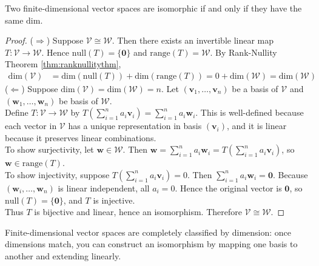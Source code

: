 \begin{theorem} \label{thm:isomorphicfindimvectorspace} Two finite-dimensional vector spaces are isomorphic if and only if they have the same $\text{dim}$.
\begin{proof} ($\Rightarrow$) Suppose $\mathcal{V} \cong \mathcal{W}$. Then there exists an invertible linear map $T: \mathcal{V} \rightarrow \mathcal{W}$. Hence $\text{null}(T) = \{ \mathbf{0} \}$ and $\text{range}(T) = \mathcal{W}$. By Rank-Nullity Theorem \ref{thm:ranknullitythm},
\begin{align}
\text{dim}(\mathcal{V}) &= \text{dim}(\text{null}(T)) + \text{dim}(\text{range}(T)) = 0 + \text{dim}(\mathcal{W}) = \text{dim}(\mathcal{W}) \nonumber
\end{align}
($\Leftarrow$) Suppose $\text{dim}(\mathcal{V}) = \text{dim}(\mathcal{W}) = n$. Let $(\mathbf{v}_1, \ldots, \mathbf{v}_n)$ be a basis of $\mathcal{V}$ and $(\mathbf{w}_1, \ldots, \mathbf{w}_n)$ be basis of $\mathcal{W}$.\\
Define $T: \mathcal{V} \rightarrow \mathcal{W}$ by $ T\left( \sum\limits_{i=1}^n a_i \mathbf{v}_i \right) = \sum\limits_{i=1}^n a_i \mathbf{w}_i$. This is well-defined because each vector in $\mathcal{V}$ has a unique representation in basis $(\mathbf{v}_i)$, and it is linear because it preserves linear combinations.\\
To show surjectivity, let $\mathbf{w} \in \mathcal{W}$. Then $\mathbf{w} = \sum\limits_{i=1}^n a_i \mathbf{w}_i = T \left( \sum\limits_{i=1}^n a_i \mathbf{v}_i \right)$, so $\mathbf{w} \in \text{range}(T)$.\\
To show injectivity, suppose $T \left( \sum\limits_{i=1}^n a_i \mathbf{v}_i \right) = 0$. Then $\sum\limits_{i=1}^n a_i \mathbf{w}_i = \mathbf{0}$. Because $(\mathbf{w}_i, \ldots, \mathbf{w}_n)$ is linear independent, all $a_i = 0$. Hence the original vector is $\mathbf{0}$, so $\text{null}(T) = \{ \mathbf{0} \}$, and $T$ is injective.\\
Thus $T$ is bijective and linear, hence an isomorphism. Therefore $\mathcal{V} \cong \mathcal{W}$.
\end{proof}
\end{theorem}

Finite-dimensional vector spaces are completely classified by dimension: once dimensions match, you can construct an isomorphism by mapping one basis to another and extending linearly.

